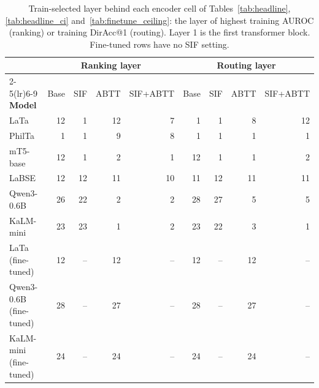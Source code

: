 \begin{table}[t]
\centering
\small
\setlength{\tabcolsep}{5pt}
\begin{tabular}{lrrrrrrrr}
\toprule
& \multicolumn{4}{c}{\textbf{Ranking layer}} & \multicolumn{4}{c}{\textbf{Routing layer}} \\
\cmidrule(lr){2-5}\cmidrule(lr){6-9}
\textbf{Model} & Base & SIF & ABTT & SIF+ABTT & Base & SIF & ABTT & SIF+ABTT \\
\midrule
LaTa & 12 & 1 & 12 & 7 & 1 & 1 & 8 & 12 \\
PhilTa & 1 & 1 & 9 & 8 & 1 & 1 & 1 & 1 \\
mT5-base & 12 & 1 & 2 & 1 & 12 & 1 & 1 & 2 \\
LaBSE & 12 & 12 & 11 & 10 & 11 & 12 & 11 & 11 \\
Qwen3-0.6B & 26 & 22 & 2 & 2 & 28 & 27 & 5 & 5 \\
KaLM-mini & 23 & 23 & 1 & 2 & 23 & 22 & 3 & 1 \\
\midrule
LaTa (fine-tuned) & 12 & -- & 12 & -- & 12 & -- & 12 & -- \\
Qwen3-0.6B (fine-tuned) & 28 & -- & 27 & -- & 28 & -- & 27 & -- \\
KaLM-mini (fine-tuned) & 24 & -- & 24 & -- & 24 & -- & 24 & -- \\
\bottomrule
\end{tabular}
\caption{Train-selected layer behind each encoder cell of Tables~\ref{tab:headline}, \ref{tab:headline_ci} and~\ref{tab:finetune_ceiling}: the layer of highest training AUROC (ranking) or training DirAcc@1 (routing). Layer 1 is the first transformer block. Fine-tuned rows have no SIF setting.}
\label{tab:selected_layers}
\end{table}
